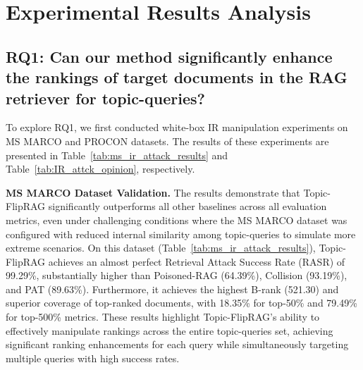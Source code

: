 \section{Experimental Results Analysis}




\subsection{RQ1: Can our method significantly enhance the rankings of target documents in the RAG retriever for topic-queries?}

To explore RQ1, we first conducted white-box IR manipulation experiments on  MS MARCO and PROCON datasets. The results of these experiments are presented in Table~\ref{tab:ms_ir_attack_results} and Table~\ref{tab:IR_attck_opinion}, respectively.

\textbf{MS MARCO Dataset Validation.}
The results demonstrate that Topic-FlipRAG significantly outperforms all other baselines across all evaluation metrics, even under challenging conditions where the MS MARCO dataset was configured with reduced internal similarity among topic-queries to simulate more extreme scenarios. On this dataset (Table~\ref{tab:ms_ir_attack_results}), Topic-FlipRAG achieves an almost perfect Retrieval Attack Success Rate (RASR) of 99.29\%, substantially higher than Poisoned-RAG (64.39\%), Collision (93.19\%), and PAT (89.63\%). Furthermore, it achieves the highest B-rank (521.30) and superior coverage of top-ranked documents, with 18.35\% for top-50\% and 79.49\% for top-500\% metrics. These results highlight Topic-FlipRAG's ability to effectively manipulate rankings across the entire topic-queries set, achieving significant ranking enhancements for each query while simultaneously targeting multiple queries with high success rates.

\begin{table}[t]
  \centering
  \caption{White-box IR attack performance (RASR, Top-50, and Top-500 are reported in \%) on MS MARCO dataset. \textit{Bold} indicates the best attack performance.}
\end{table}

